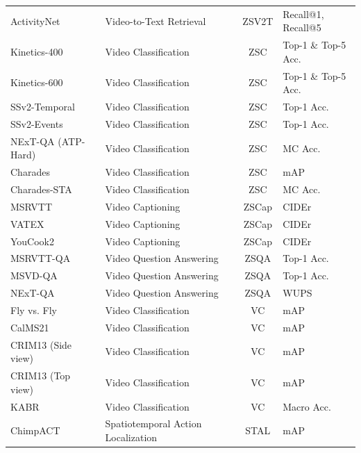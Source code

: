 \documentclass{article}
\theoremstyle{plain}
\theoremstyle{definition}
\theoremstyle{remark}
\newcommand{\tabrow}{\rowcolor{gray!10 }}
\newcommand{\cmark}{\ding{51}}
\newcommand{\xmark}{\ding{55}}
\begin{document}
\begin{table}
\begin{center}
\begin{scriptsize}
\begin{tabular}{l|l|c|c|l}
    ActivityNet~\cite{caba2015activitynet} & Video-to-Text Retrieval & \cmark & ZSV2T & Recall@1, Recall@5 \\
    \tabrow Kinetics-400~\cite{kay2017kinetics} & Video Classification & \cmark & ZSC & Top-1 \& Top-5 Acc. \\
    Kinetics-600~\cite{carreira2018short} & Video Classification & \cmark & ZSC & Top-1 \& Top-5 Acc. \\
    \tabrow SSv2-Temporal~\cite{sevilla2021only} & Video Classification & \cmark & ZSC & Top-1 Acc. \\
    SSv2-Events~\cite{bagad2023test} & Video Classification & \cmark & ZSC & Top-1 Acc. \\
    \tabrow NExT-QA (ATP-Hard)~\cite{xiao2021next} & Video Classification &  \cmark & ZSC & MC Acc. \\
    Charades~\cite{sigurdsson2016hollywood} & Video Classification & \cmark & ZSC & mAP \\
    \tabrow Charades-STA~\cite{gao2017tall} & Video Classification & \cmark & ZSC & MC Acc. \\
    \midrule
    MSRVTT~\cite{xu2016msr} & Video Captioning & \cmark & ZSCap & CIDEr \\
    \tabrow VATEX~\cite{wang2019vatex} & Video Captioning & \cmark & ZSCap & CIDEr \\
    YouCook2~\cite{zhou2018towards} & Video Captioning & \cmark & ZSCap & CIDEr \\
    \tabrow MSRVTT-QA~\cite{xu2017video} & Video Question Answering & \cmark & ZSQA & Top-1 Acc. \\
    MSVD-QA~\cite{xu2017video} & Video Question Answering & \cmark & ZSQA & Top-1 Acc. \\
    \tabrow NExT-QA~\cite{xiao2021next} & Video Question Answering & \cmark & ZSQA & WUPS \\
    \midrule
    Fly vs. Fly~\cite{eyjolfsdottir2014detecting} & Video Classification & \xmark & VC & mAP \\
    \tabrow CalMS21~\cite{sun2021multi} & Video Classification & \xmark & VC & mAP \\
    CRIM13 (Side view)~\cite{burgos2012social} & Video Classification & \xmark & VC & mAP \\
    \tabrow CRIM13 (Top view)~\cite{burgos2012social} & Video Classification & \xmark & VC & mAP \\
    KABR~\cite{kholiavchenko2024kabr} & Video Classification & \xmark & VC & Macro Acc. \\
    \tabrow ChimpACT~\cite{ma2023chimpact} & Spatiotemporal Action Localization & \xmark & STAL & mAP \\

\end{tabular}
\end{scriptsize}
\end{center}
\end{table}
\end{document}
